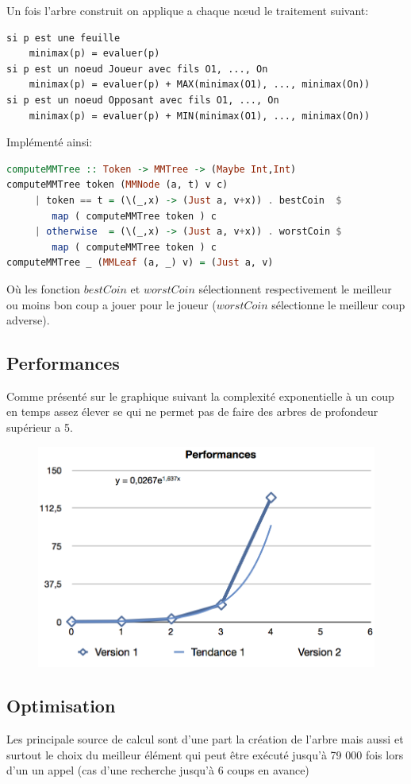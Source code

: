 \documentclass[a4paper]{article}
\begin{document}
Un fois l'arbre construit on applique a chaque n\oe ud le traitement suivant:

\begin{lstlisting}
si p est une feuille
	minimax(p) = evaluer(p)
si p est un noeud Joueur avec fils O1, ..., On
	minimax(p) = evaluer(p) + MAX(minimax(O1), ..., minimax(On))
si p est un noeud Opposant avec fils O1, ..., On 
	minimax(p) = evaluer(p) + MIN(minimax(O1), ..., minimax(On)) 
\end{lstlisting}

Implémenté ainsi:

\begin{lstlisting}[language=haskell]
computeMMTree :: Token -> MMTree -> (Maybe Int,Int)
computeMMTree token (MMNode (a, t) v c)
	 | token == t = (\(_,x) -> (Just a, v+x)) . bestCoin  $
	 	map ( computeMMTree token ) c
	 | otherwise  = (\(_,x) -> (Just a, v+x)) . worstCoin $
	 	map ( computeMMTree token ) c
computeMMTree _ (MMLeaf (a, _) v) = (Just a, v)
\end{lstlisting}

Où les fonction $bestCoin$ et $worstCoin$ sélectionnent respectivement le meilleur ou moins bon coup a jouer pour le joueur ($worstCoin$ sélectionne le meilleur coup adverse).

\subsection{Performances}

Comme présenté sur le graphique suivant la complexité exponentielle à un coup en temps assez élever se qui ne permet pas de faire des arbres de profondeur supérieur a 5.

\begin{figure}
\includegraphics[scale=0.80]{Performance}
\end{figure}

\subsection{Optimisation}

Les principale source de calcul sont d'une part la création de l'arbre mais aussi et surtout le choix du meilleur élément qui peut être exécuté jusqu'à 79 000 fois lors d'un un appel (cas d'une recherche jusqu'à 6 coups en avance)



\end{document}
